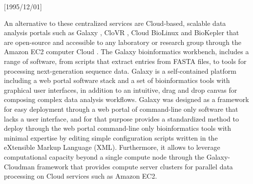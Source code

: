 \NeedsTeXFormat{LaTeX2e}[1995/12/01] \documentclass[10pt]{bmc_article}
\newenvironment{bmcformat}{\begin{raggedright}\baselineskip20pt\sloppy\setboolean{publ}{false}}{\end{raggedright}\baselineskip20pt\sloppy}
\begin{document}
\begin{bmcformat}
An alternative to these centralized services are Cloud-based, scalable data analysis portals such as Galaxy
\cite{Goecks2010}, CloVR \cite{Angiuoli2011}, Cloud BioLinux \cite{Krampis2012} and BioKepler \cite{Altintas2011} 
that are open-source and accessible to any laboratory or research group through the Amazon EC2 computer Cloud 
\cite{awsec2}. The Galaxy bioinformatics workbench, includes a range of software, from scripts that extract 
entries from FASTA files, to tools for processing next-generation sequence data. Galaxy is a self-contained 
platform including a web portal software stack and a set of bioinformatics tools with graphical user interfaces, 
in addition to an intuitive, drag and drop canvas for composing complex data analysis workflows. Galaxy was 
designed as a framework for easy deployment through a web portal of command-line only software that lacks a user 
interface, and for that purpose provides a standardized method to deploy through the web portal command-line only
bioinformatics tools with minimal expertise by editing simple configuration scripts written in the eXtensible 
Markup Language (XML). Furthermore, it allows to leverage computational capacity beyond a single compute node 
through the Galaxy-Cloudman \cite{Afgan2010} framework that provides compute server clusters for parallel data 
processing on Cloud services such as Amazon EC2.


\end{bmcformat}
\end{document}
